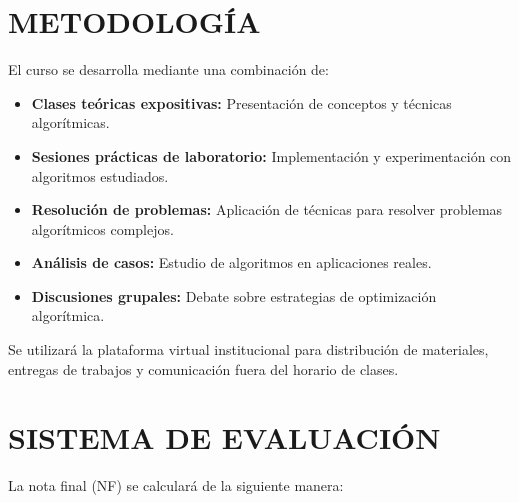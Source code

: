 \documentclass[12pt,a4paper]{article}
\begin{document}
\section{METODOLOGÍA}
\begin{tcolorbox}[colback=pucpGris!5,colframe=pucpGris,title=\textbf{Enfoque Metodológico}]
El curso se desarrolla mediante una combinación de:

\begin{itemize}[leftmargin=*]
    \item \textbf{Clases teóricas expositivas:} Presentación de conceptos y técnicas algorítmicas.
    \item \textbf{Sesiones prácticas de laboratorio:} Implementación y experimentación con algoritmos estudiados.
    \item \textbf{Resolución de problemas:} Aplicación de técnicas para resolver problemas algorítmicos complejos.
    \item \textbf{Análisis de casos:} Estudio de algoritmos en aplicaciones reales.
    \item \textbf{Discusiones grupales:} Debate sobre estrategias de optimización algorítmica.
\end{itemize}

\begin{center}
\end{center}

Se utilizará la plataforma virtual institucional para distribución de materiales, entregas de trabajos y comunicación fuera del horario de clases.
\end{tcolorbox}
\vspace{0.5cm}

\section{SISTEMA DE EVALUACIÓN}

La nota final (NF) se calculará de la siguiente manera:
\end{document}
